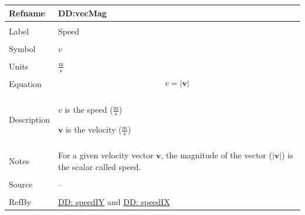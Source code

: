 \documentclass[12pt]{article}
\begin{document}
\vspace{\baselineskip}
\noindent
\begin{minipage}{\textwidth}
\begin{tabular}{>{\raggedright}p{}>{\raggedright\arraybackslash}p{}}
\toprule \textbf{Refname} & \textbf{DD:vecMag}
\label{DD:vecMag}
\\ \midrule \\
Label & Speed
        
\\ \midrule \\
Symbol & $v$
         
\\ \midrule \\
Units & $\frac{\text{m}}{\text{s}}$
        
\\ \midrule \\
Equation & \begin{displaymath}
           v=|\mathbf{v}|
           \end{displaymath}
\\ \midrule \\
Description & \begin{symbDescription}
              \item{$v$ is the speed ($\frac{\text{m}}{\text{s}}$)}
              \item{$\mathbf{v}$ is the velocity ($\frac{\text{m}}{\text{s}}$)}
              \end{symbDescription}
\\ \midrule \\
Notes & For a given velocity vector $\mathbf{v}$, the magnitude of the vector ($|\mathbf{v}|$) is the scalar called speed.
        
\\ \midrule \\
Source & --
         
\\ \midrule \\
RefBy & \hyperref[DD:speedIY]{DD: speedIY} and \hyperref[DD:speedIX]{DD: speedIX}
        
\\ \bottomrule
\end{tabular}
\end{minipage}
\end{document}
